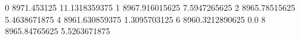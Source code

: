 0 8971.453125 11.1318359375
1 8967.916015625 7.5947265625
2 8965.78515625 5.4638671875
4 8961.630859375 1.3095703125
6 8960.3212890625 0.0
8 8965.84765625 5.5263671875
